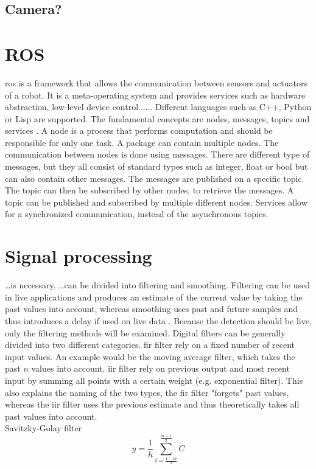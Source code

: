 \subsection{Camera?}



\section{ROS}
\gls{ros} is a framework that allows the communication between sensors and actuators of a robot.
It is a meta-operating system and provides services such as hardware abstraction, low-level device control......
Different languages such as C++, Python or Lisp are supported.
The fundamental concepts are nodes, messages, topics and services \cite{Quigley2009}.
A node is a process that performs computation and should be responsible for only one task.
A package can contain multiple nodes.
The communication between nodes is done using messages.
There are different type of messages, but they all consist of standard types such as integer, float or bool but can also contain other messages.
The messages are published on a specific topic.
The topic can then be subscribed by other nodes, to retrieve the messages.
A topic can be published and subscribed by multiple different nodes.
Services allow for a synchronized communication, instead of the asynchronous topics.



\section{Signal processing}
\dots is necessary.
\dots can be divided into filtering and smoothing.
Filtering can be used in live applications and produces an estimate of the current value by taking the past values into account, whereas smoothing uses past and future samples and thus introduces a delay if used on live data .
Because the detection should be live, only the filtering methods will be examined.
Digital filters can be generally divided into two different categories.
\gls{fir} filter rely on a fixed number of recent input values. An example would be the moving average filter, which takes the past $n$ values into account.
\gls{iir} filter rely on previous output and most recent input by summing all points with a certain weight (e.g. exponential filter).
This also explains the naming of the two types, the \gls{fir} filter "forgets" past values, whereas the \gls{iir} filter uses the previous estimate and thus theoretically takes all past values into account.\\
Savitzky-Golay filter
\begin{equation}
	y = \frac{1}{h}\sum_{i =\frac{1 - m}{2}}^{\frac{m - 1}{2}}C
\end{equation}

